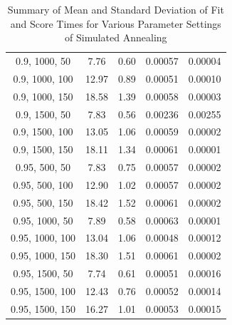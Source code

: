 \documentclass{article}
\begin{document}
\begin{table}[H]
{\begin{tabular}{|c|c|c|c|c|}
                0.9, 1000, 50              & 7.76                   & 0.60                  & 0.00057                  & 0.00004                 \\
                0.9, 1000, 100             & 12.97                  & 0.89                  & 0.00051                  & 0.00010                 \\
                0.9, 1000, 150             & 18.58                  & 1.39                  & 0.00058                  & 0.00003                 \\
                0.9, 1500, 50              & 7.83                   & 0.56                  & 0.00236                  & 0.00255                 \\
                0.9, 1500, 100             & 13.05                  & 1.06                  & 0.00059                  & 0.00002                 \\
                0.9, 1500, 150             & 18.11                  & 1.34                  & 0.00061                  & 0.00001                 \\
                0.95, 500, 50              & 7.83                   & 0.75                  & 0.00057                  & 0.00002                 \\
                0.95, 500, 100             & 12.90                  & 1.02                  & 0.00057                  & 0.00002                 \\
                0.95, 500, 150             & 18.42                  & 1.52                  & 0.00061                  & 0.00002                 \\
                0.95, 1000, 50             & 7.89                   & 0.58                  & 0.00063                  & 0.00001                 \\
                0.95, 1000, 100            & 13.04                  & 1.06                  & 0.00048                  & 0.00012                 \\
                0.95, 1000, 150            & 18.30                  & 1.51                  & 0.00061                  & 0.00002                 \\
                0.95, 1500, 50             & 7.74                   & 0.61                  & 0.00051                  & 0.00016                 \\
                0.95, 1500, 100            & 12.43                  & 0.76                  & 0.00052                  & 0.00014                 \\
                0.95, 1500, 150            & 16.27                  & 1.01                  & 0.00053                  & 0.00015                 \\
                \hline
            \end{tabular}
        }
        \caption{Summary of Mean and Standard Deviation of Fit and Score Times for Various Parameter Settings of Simulated Annealing}
        \label{tab:sa_summary_fit_score_times}
    \end{table}
\end{document}
